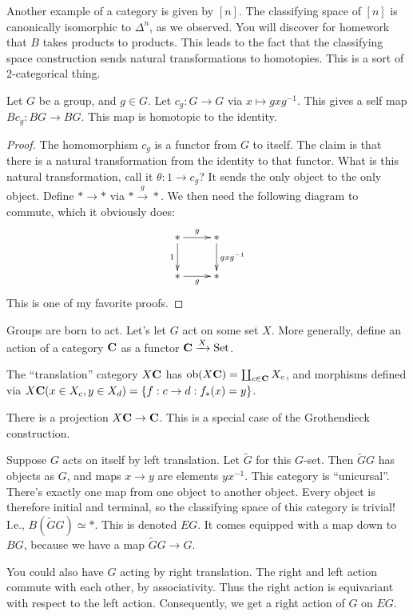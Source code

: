 Another example of a category is given by $[n]$.
The classifying space of $[n]$ is canonically isomorphic to $\Delta^n$, as we observed.
You will discover for homework that $B$ takes products to products.
This leads to the fact that the classifying space construction sends natural transformations to homotopies.
This is a sort of 2-categorical thing.
\begin{lemma}
    Let $G$ be a group, and $g\in G$.
    Let $c_g:G\to G$ via $x\mapsto gxg^{-1}$.
    This gives a self map $Bc_g:BG\to BG$.
    This map is homotopic to the identity.
\end{lemma}
\begin{proof}
    The homomorphism $c_g$ is a functor from $G$ to itself.
    The claim is that there is a natural transformation from the identity to that functor.
    What is this natural transformation, call it $\theta:1\to c_g$?
    It sends the only object to the only object.
    Define $\ast\to \ast$ via $\ast\xrightarrow{g}\ast$.
    We then need the following diagram to commute, which it obviously does:
    \begin{equation*}
	\xymatrix{
	    \ast\ar[d]_1\ar[r]^g & \ast\ar[d]^{gxg^{-1}}\\
	    \ast\ar[r]_{g} & \ast
	    }
    \end{equation*}
    This is one of my favorite proofs.
\end{proof}
Groups are born to act.
Let's let $G$ act on some set $X$.
More generally, define an action of a category $\mathbf C$ as a functor $\mathbf C\xrightarrow{X}\mathrm{Set}$.
\begin{definition}
    The ``translation'' category $X\mathbf C$ has $\mathrm{ob}(X\mathbf C) = \coprod_{c\in \mathbf C}X_c$, and morphisms defined via $X\mathbf C(x\in X_c, y\in X_d) = \{f:c\to d:f_\ast(x) = y\}$.
\end{definition}
There is a projection $X\mathbf C\to \mathbf C$.
This is a special case of the Grothendieck construction.
\begin{example}
    Suppose $G$ acts on itself by left translation.
    Let $\widetilde{G}$ for this $G$-set.
    Then $\widetilde{G}G$ has objects as $G$, and maps $x\to y$ are elements $yx^{-1}$.
    This category is ``unicursal''.
    There's exactly one map from one object to another object.
    Every object is therefore initial and terminal, so the classifying space of this category is trivial!
    I.e., $B(\widetilde{G}G)\simeq\ast$.
    This is denoted $EG$.
    It comes equipped with a map down to $BG$, because we have a map $\widetilde{G}G\to G$.
\end{example}
You could also have $G$ acting by right translation.
The right and left action commute with each other, by associativity.
Thus the right action is equivariant with respect to the left action.
Consequently, we get a right action of $G$ on $EG$.

